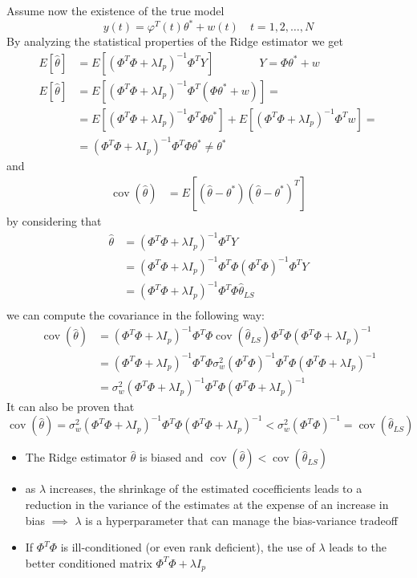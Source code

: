\documentclass{book}
\DeclareMathOperator{\cov}{cov}
\theoremstyle{definition}
\theoremstyle{remark}
\theoremstyle{remark}
\begin{document}
Assume now the existence of the true model 
\[
    y(t)=\varphi^T(t)\theta^*+w(t) \quad t=1,2,\dots,N
\]
By analyzing the statistical properties of the Ridge estimator we get
\begin{align*}
    E[\hat{\theta}]&=E[(\Phi^T\Phi+\lambda I_p)^{-1}\Phi^TY]\qquad\qquad Y=\Phi\theta^*+w\\
    E[\hat{\theta}]&=E[(\Phi^T\Phi+\lambda I_p)^{-1}\Phi^T(\Phi\theta^*+w)]=\\
    &=E[(\Phi^T\Phi+\lambda I_p)^{-1}\Phi^T\Phi\theta^*]+E[(\Phi^T\Phi+\lambda I_p)^{-1}\Phi^Tw]=\\
    &=(\Phi^T\Phi+\lambda I_p)^{-1}\Phi^T\Phi\theta^*\neq \theta^*
\end{align*}
and 
\begin{align*}
    \cov(\hat{\theta}) &= E\left[ (\hat{\theta}-\theta^*)(\hat{\theta}-\theta^*)^T \right]
\end{align*}
by considering that 
\begin{align*}
    \hat{\theta} &= (\Phi^T\Phi+\lambda I_p)^{-1}\Phi^T Y\\
                 &= (\Phi^T\Phi+\lambda I_p)^{-1}\Phi^T\Phi(\Phi^T\Phi)^{-1}\Phi^T Y\\
                 &= (\Phi^T\Phi+\lambda I_p)^{-1}\Phi^T\Phi \hat{\theta}_{LS} \\
\end{align*}     
we can compute the covariance in the following way:
\begin{align*}
    \cov(\hat{\theta}) &= (\Phi^T\Phi+\lambda I_p)^{-1}\Phi^T\Phi \cov(\hat{\theta}_{LS})\Phi^T\Phi (\Phi^T\Phi+\lambda I_p)^{-1}\\
                       &= (\Phi^T\Phi+\lambda I_p)^{-1}\Phi^T\Phi \sigma_w^2 (\Phi^T \Phi)^{-1} \Phi^T\Phi (\Phi^T\Phi+\lambda I_p)^{-1}\\
                       &= \sigma_w^2(\Phi^T\Phi+\lambda I_p)^{-1}\Phi^T\Phi (\Phi^T\Phi+\lambda I_p)^{-1}
\end{align*}
It can also be proven that
\[
    \cov(\hat{\theta})=\sigma_w^2(\Phi^T\Phi+\lambda I_p)^{-1}\Phi^T\Phi(\Phi^T\Phi+\lambda I_p)^{-1}<\sigma_w^2(\Phi^T\Phi)^{-1}=\cov(\hat{\theta}_{LS})
\]
\begin{itemize}
    \item The Ridge estimator $\hat{\theta}$ is biased and $\cov(\hat{\theta})<\cov(\hat{\theta}_{LS})$
    \item as $\lambda$ increases, the shrinkage of the estimated cocefficients leads to a reduction in the variance of the estimates at the expense of an increase in bias $\implies$ $\lambda$ is a hyperparameter that can manage the bias-variance tradeoff
    \item If $\Phi^T\Phi$ is ill-conditioned (or even rank deficient), the use of $\lambda$ leads to the better conditioned matrix $\Phi^T\Phi+\lambda I_p$
\end{itemize}
\end{document}
